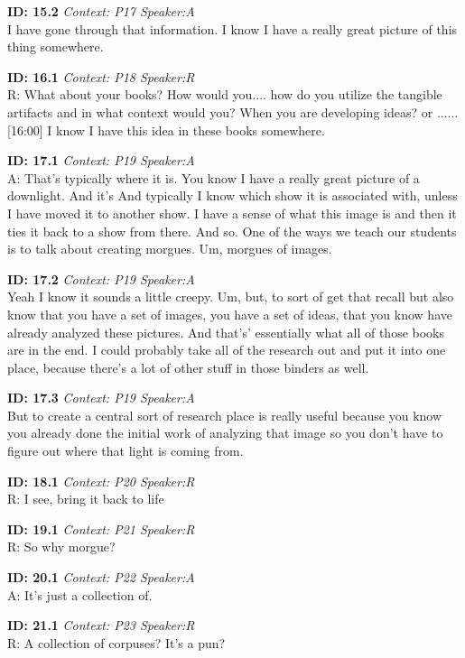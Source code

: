 \documentclass[10pt]{book}
\begin{document}
\begin{landscape}
\textbf{ID: 15.2} \emph{Context: P17 Speaker:A}\\ 
I have gone through that information. I know I have a really great picture of this thing somewhere. \newpage 

\textbf{ID: 16.1} \emph{Context: P18 Speaker:R}\\ 
R: What about your books? How would you.... how do you utilize the tangible artifacts and in what context would you? When you are developing ideas? or ......[16:00] I know I have this idea in these books somewhere. \newpage 

\textbf{ID: 17.1} \emph{Context: P19 Speaker:A}\\ 
A: That's typically where it is. You know I have a really great picture of a downlight. And it's And typically I know which show it is associated with, unless I have moved it to another show. I have a sense of what this image is and then it ties it back to a show from there. And so. One of the ways we teach our students is to talk about creating morgues. Um, morgues of images. \newpage 

\textbf{ID: 17.2} \emph{Context: P19 Speaker:A}\\ 
Yeah I know it sounds a little creepy. Um, but, to sort of get that recall but also know that you have a set of images, you have a set of ideas, that you know have already analyzed these pictures. And that's' essentially what all of those books are in the end. I could probably take all of the research out and put it into one place, because there's a lot of other stuff in those binders as well. \newpage 

\textbf{ID: 17.3} \emph{Context: P19 Speaker:A}\\ 
But to create a central sort of research place is really useful because you know you already done the initial work of analyzing that image so you don't have to figure out where that light is coming from. \newpage 

\textbf{ID: 18.1} \emph{Context: P20 Speaker:R}\\ 
R: I see, bring it back to life \newpage 

\textbf{ID: 19.1} \emph{Context: P21 Speaker:R}\\ 
R: So why morgue? \newpage 

\textbf{ID: 20.1} \emph{Context: P22 Speaker:A}\\ 
A: It's just a collection of. \newpage 

\textbf{ID: 21.1} \emph{Context: P23 Speaker:R}\\ 
R: A collection of corpuses? It's a pun? \newpage 


\end{landscape}
\end{document}
